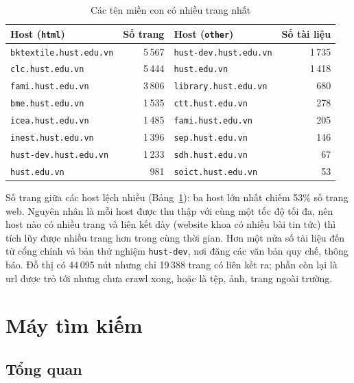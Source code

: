 \documentclass[12pt,a4paper]{report}
\begin{document}
\begin{table}[ht]
\centering
\caption{Các tên miền con có nhiều trang nhất}\label{tab:hosts}
\small
\begin{tabular}{l r @{\hspace{0.6cm}} l r}
\toprule
Host (\texttt{html}) & Số trang & Host (\texttt{other}) & Số tài liệu \\
\midrule
\texttt{bktextile.hust.edu.vn} & 5\,567 & \texttt{hust-dev.hust.edu.vn} & 1\,735 \\
\texttt{clc.hust.edu.vn} & 5\,444 & \texttt{hust.edu.vn} & 1\,418 \\
\texttt{fami.hust.edu.vn} & 3\,806 & \texttt{library.hust.edu.vn} & 680 \\
\texttt{bme.hust.edu.vn} & 1\,535 & \texttt{ctt.hust.edu.vn} & 278 \\
\texttt{icea.hust.edu.vn} & 1\,485 & \texttt{fami.hust.edu.vn} & 205 \\
\texttt{inest.hust.edu.vn} & 1\,396 & \texttt{sep.hust.edu.vn} & 146 \\
\texttt{hust-dev.hust.edu.vn} & 1\,233 & \texttt{sdh.hust.edu.vn} & 67 \\
\texttt{hust.edu.vn} & 981 & \texttt{soict.hust.edu.vn} & 53 \\
\bottomrule
\end{tabular}
\end{table}

Số trang giữa các host lệch nhiều (Bảng~\ref{tab:hosts}): ba host lớn nhất chiếm 53\% số trang web. Nguyên nhân là mỗi
host được thu thập với cùng một tốc độ tối đa, nên host nào có nhiều trang và liên kết dày (website khoa có nhiều bài
tin tức) thì tích lũy được nhiều trang hơn trong cùng thời gian. Hơn một nửa số tài liệu đến từ cổng chính và bản thử
nghiệm \texttt{hust-dev}, nơi đăng các văn bản quy chế, thông báo. Đồ thị có 44\,095 nút nhưng chỉ 19\,388 trang có liên
kết ra; phần còn lại là url được trỏ tới nhưng chưa crawl xong, hoặc là tệp, ảnh, trang ngoài trường.

\chapter{Máy tìm kiếm}\label{ch:search}

\section{Tổng quan}
\end{document}
